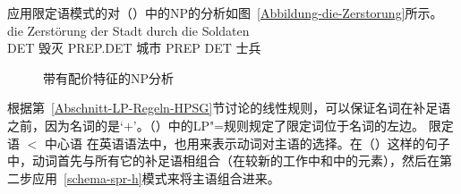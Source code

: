 应用限定语模式的对（）中的NP的分析如图~\vref{Abbildung-die-Zerstorung}所示。
\ea
\gll die Zerstörung der Stadt durch die Soldaten\\
	 DET 毁灭 PREP.DET 城市 PREP DET 士兵\\
\z
\begin{figure}
\caption{带有配价特征\spr 的NP分析}\label{Abbildung-die-Zerstorung} 
\end{figure}%
根据第~\ref{Abschnitt-LP-Regeln-HPSG}节讨论的线性规则，可以保证名词在补足语之前，因为名词的\initialv 是`$+$'。（）中的LP"=规则规定了限定词位于名词的左边。
\ea
限定语 $<$ 中心语
\z
%
%
在英语语法中，\sprf  也用来表示动词对主语的选择\citep*[Section~4.3]{SWB2003a}。在（）这样的句子中，动词首先与所有它的补足语相组合（在较新的工作中\subcat 和\comps 中的元素），然后在第二步应用~\ref{schema-spr-h}模式来将主语组合进来。
